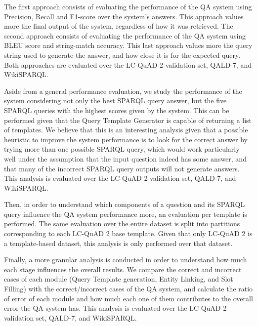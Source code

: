 The first approach consists of evaluating the performance of the QA system using Precision, 
Recall and F1-score over the system’s answers. This approach values more the final output of the 
system, regardless of how it was retrieved. The second approach consists of evaluating the 
performance of the QA system using BLEU score and string-match accuracy. This last approach 
values more the query string used to generate the answer, and how close it is for the expected 
query. Both approaches are evaluated over the LC-QuAD 2 validation set, QALD-7, and WikiSPARQL.

Aside from a general performance evaluation, we study the performance of the system considering 
not only the best SPARQL query answer, but the five SPARQL queries with the highest scores given 
by the system. This can be performed given that the Query Template Generator is capable of 
returning a list of templates. We believe that this is an interesting analysis given that a 
possible heuristic to improve the system performance is to look for the correct answer by trying 
more than one possible SPARQL query, which would work particularly well under the assumption 
that the input question indeed has some answer, and that many of the incorrect SPARQL query 
outputs will not generate answers. This analysis is evaluated over the LC-QuAD 2 validation set, 
QALD-7, and WikiSPARQL.

Then, in order to understand which components of a question and its SPARQL query influence the 
QA system performance more, an evaluation per template is performed. The same evaluation over 
the entire dataset is split into partitions corresponding to each LC-QuAD 2 base template. Given 
that only LC-QuAD 2 is a template-based dataset, this analysis is only performed over that 
dataset.

Finally, a more granular analysis is conducted in order to understand how much each stage 
influences the overall results. We compare the correct and incorrect cases of each module (Query 
Template generation, Entity Linking, and Slot Filling) with the correct/incorrect cases of the 
QA system, and calculate the ratio of error of each module and how much each one of them 
contributes to the overall error the QA system has. This analysis is evaluated over the LC-QuAD 2 
validation set, QALD-7, and WikiSPARQL.
